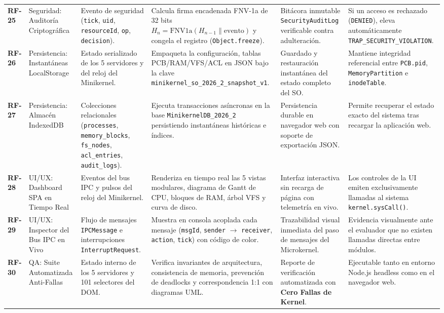 \documentclass[10pt,twocolumn,letterpaper]{article}
\begin{document}
\begin{table}[!t]
\begin{tabularx}{\textwidth}{C{0.9cm} L{2.2cm} L{2.8cm} Y L{2.8cm} L{3.3cm}}
\textbf{RF-25} & Seguridad: Auditor\'ia Criptogr\'afica & Evento de seguridad (\texttt{tick}, \texttt{uid}, \texttt{resourceId}, \texttt{op}, \texttt{decision}). & Calcula firma encadenada FNV-1a de 32 bits $H_n = \text{FNV1a}(H_{n-1} \parallel \text{evento})$ y congela el registro (\texttt{Object.freeze}). & Bit\'acora inmutable \texttt{SecurityAuditLog} verificable contra adulteraci\'on. & Si un acceso es rechazado (\texttt{DENIED}), eleva autom\'aticamente \texttt{TRAP\_SECURITY\_VIOLATION}. \\
\textbf{RF-26} & Persistencia: Instant\'aneas LocalStorage & Estado serializado de los 5 servidores y del reloj del Minikernel. & Empaqueta la configuraci\'on, tablas PCB/RAM/VFS/ACL en JSON bajo la clave \texttt{minikernel\_so\_2026\_2\_snapshot\_v1}. & Guardado y restauraci\'on instant\'anea del estado completo del SO. & Mantiene integridad referencial entre \texttt{PCB.pid}, \texttt{MemoryPartition} e \texttt{inodeTable}. \\
\textbf{RF-27} & Persistencia: Almac\'en IndexedDB & Colecciones relacionales (\texttt{processes}, \texttt{memory\_blocks}, \texttt{fs\_nodes}, \texttt{acl\_entries}, \texttt{audit\_logs}). & Ejecuta transacciones as\'incronas en la base \texttt{MinikernelDB\_2026\_2} persistiendo instant\'aneas hist\'oricas e \'indices. & Persistencia durable en navegador web con soporte de exportaci\'on JSON. & Permite recuperar el estado exacto del sistema tras recargar la aplicaci\'on web. \\
\textbf{RF-28} & UI/UX: Dashboard SPA en Tiempo Real & Eventos del bus IPC y pulsos del reloj del Minikernel. & Renderiza en tiempo real las 5 vistas modulares, diagrama de Gantt de CPU, bloques de RAM, \'arbol VFS y curva de disco. & Interfaz interactiva sin recarga de p\'agina con telemetr\'ia en vivo. & Los controles de la UI emiten exclusivamente llamadas al sistema \texttt{kernel.sysCall()}. \\
\textbf{RF-29} & UI/UX: Inspector del Bus IPC en Vivo & Flujo de mensajes \texttt{IPCMessage} e interrupciones \texttt{InterruptRequest}. & Muestra en consola acoplada cada mensaje (\texttt{msgId}, \texttt{sender} $\rightarrow$ \texttt{receiver}, \texttt{action}, \texttt{tick}) con c\'odigo de color. & Trazabilidad visual inmediata del paso de mensajes del Microkernel. & Evidencia visualmente ante el evaluador que no existen llamadas directas entre m\'odulos. \\
\textbf{RF-30} & QA: Suite Automatizada Anti-Fallas & Estado interno de los 5 servidores y 101 selectores del DOM. & Verifica invariantes de arquitectura, consistencia de memoria, prevenci\'on de deadlocks y correspondencia 1:1 con diagramas UML. & Reporte de verificaci\'on automatizada con \textbf{Cero Fallas de Kernel}. & Ejecutable tanto en entorno Node.js headless como en el navegador web. \\
\bottomrule
\end{tabularx}
\end{table}
\end{document}
